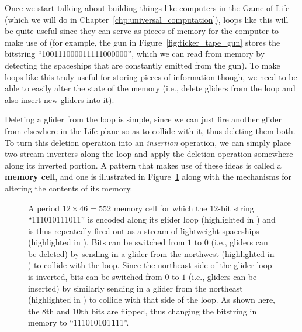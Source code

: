 Once we start talking about building things like computers in the Game of Life (which we will do in Chapter~\ref{chp:universal_computation}), loops like this will be quite useful since they can serve as pieces of memory for the computer to make use of (for example, the gun in Figure~\ref{fig:ticker_tape_gun} stores the bitstring ``100111000011111000000'', which we can read from memory by detecting the spaceships that are constantly emitted from the gun). To make loops like this truly useful for storing pieces of information though, we need to be able to easily alter the state of the memory (i.e., delete gliders from the loop and also insert new gliders into it).

Deleting a glider from the loop is simple, since we can just fire another glider from elsewhere in the Life plane so as to collide with it, thus deleting them both. To turn this deletion operation into an \emph{insertion} operation, we can simply place two stream inverters along the loop and apply the deletion operation somewhere along its inverted portion. A pattern that makes use of these ideas is called a \textbf{memory cell}, and one is illustrated in Figure~\ref{fig:p46_memory_cell} along with the mechanisms for altering the contents of its memory.

\begin{figure}[!htb]
	\centering
	\caption{A period $12 \times 46 = 552$ memory cell for which the $12$-bit string ``111010111011'' is encoded along its glider loop (highlighted in ) and is thus repeatedly fired out as a stream of lightweight spaceships (highlighted in ). Bits can be switched from $1$ to $0$ (i.e., gliders can be deleted) by sending in a glider from the northwest (highlighted in ) to collide with the loop. Since the northeast side of the glider loop is inverted, bits can be switched from $0$ to $1$ (i.e., gliders can be inserted) by similarly sending in a glider from the northeast (highlighted in ) to collide with that side of the loop. As shown here, the $8$th and $10$th bits are flipped, thus changing the bitstring in memory to ``1110101\textbf{0}1\textbf{1}11''.}\label{fig:p46_memory_cell}
\end{figure}


